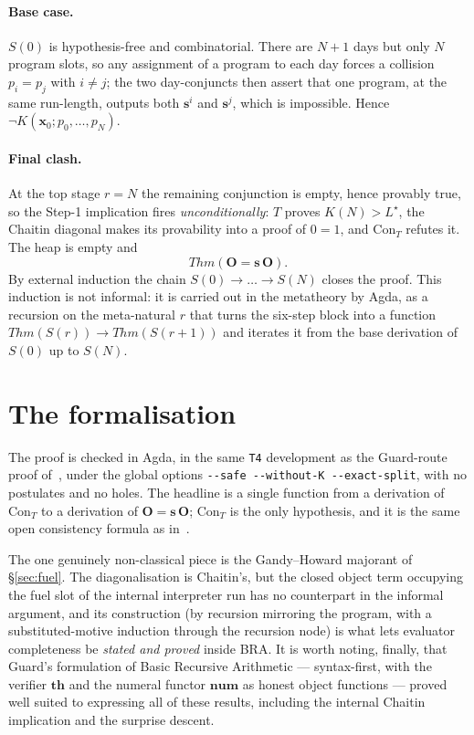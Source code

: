 \documentclass[11pt]{article}
\theoremstyle{plain}
\theoremstyle{definition}
\theoremstyle{remark}
\newcommand{\thmT}{\mathbf{th}}
\newcommand{\num}{\mathbf{num}}
\newcommand{\Kc}{K}
\newcommand{\Con}{\mathrm{Con}}
\newcommand{\Thm}[1]{\mathit{Thm}(#1)}
\newcommand{\Lstar}{L^{\!\star}}
\begin{document}
\paragraph{Base case.}
$S(0)$ is hypothesis-free and combinatorial. There are $N+1$ days but
only $N$ program slots, so any assignment of a program to each day forces
a collision $p_i = p_j$ with $i\neq j$; the two day-conjuncts then assert
that one program, at the same run-length, outputs both $\mathbf{s}^i$ and
$\mathbf{s}^j$, which is impossible. Hence $\neg\Kc(\mathbf{x}_0;p_0,\dots,p_N)$.

\paragraph{Final clash.}
At the top stage $r=N$ the remaining conjunction is empty, hence
provably true, so the Step-1 implication fires \emph{unconditionally}:
$T$ proves $\Kc(N)>\Lstar$, the Chaitin diagonal makes its provability
into a proof of $0=1$, and $\Con_T$ refutes it. The heap is empty and
\[
  \Thm{\mathbf{O}=\mathbf{s}\,\mathbf{O}}.
\]
By external induction the chain $S(0)\to\dots\to S(N)$ closes the proof.
This induction is not informal: it is carried out in the metatheory by
Agda, as a recursion on the meta-natural $r$ that turns the six-step
block into a function
$\Thm{S(r)} \to \Thm{S(r+1)}$ and iterates it from
the base derivation of $S(0)$ up to $S(N)$.

\section{The formalisation}
\label{sec:formal}

The proof is checked in Agda, in the same \texttt{T4} development as the
Guard-route proof of~\cite{arGII}, under the global options
\texttt{-{}-safe -{}-without-K -{}-exact-split}, with no postulates and no
holes. The headline is a single function from a derivation of $\Con_T$ to
a derivation of $\mathbf{O}=\mathbf{s}\,\mathbf{O}$; $\Con_T$ is the only
hypothesis, and it is the same open consistency formula as
in~\cite{arGII}.

The one genuinely non-classical piece is the Gandy--Howard majorant of
\S\ref{sec:fuel}. The diagonalisation is Chaitin's, but the closed object
term occupying the fuel slot of the internal interpreter run has no
counterpart in the informal argument, and its construction (by recursion
mirroring the program, with a substituted-motive induction through the
recursion node) is what lets evaluator completeness be \emph{stated and
proved} inside BRA. It is worth noting, finally, that Guard's
formulation of Basic Recursive Arithmetic --- syntax-first, with the
verifier $\thmT$ and the numeral functor $\num$ as honest object
functions --- proved well suited to expressing all of these results,
including the internal Chaitin implication and the surprise descent.
\end{document}
